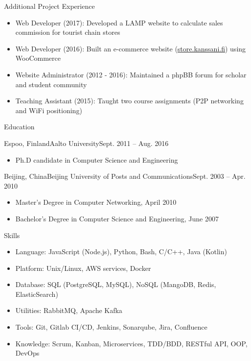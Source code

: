 \documentclass[print]{mcdowellcv}
\begin{document}
	\begin{cvsection}{Additional Project Experience}
		\begin{cvsubsection}{}{}{}	
			\begin{itemize}
				\item Web Developer (2017): Developed a LAMP website to calculate sales commission for tourist chain stores
				\item Web Developer (2016): Built an e-commerce website (\url{store.kanssani.fi}) using WooCommerce
				\item Website Administrator (2012 - 2016): Maintained a phpBB forum for scholar and student community
				\item Teaching Assistant (2015): Taught two course assignments (P2P networking and WiFi positioning)
			\end{itemize}
		\end{cvsubsection}
	\end{cvsection}
	
	\begin{cvsection}{Education}
		\begin{cvsubsection}{Espoo, Finland}{Aalto University}{Sept. 2011 -- Aug. 2016}
			\begin{itemize}
				\item Ph.D candidate in Computer Science and Engineering
			\end{itemize}
		\end{cvsubsection}

		\begin{cvsubsection}[3]{Beijing, China}{Beijing University of Posts and Communications}{Sept. 2003 --  Apr. 2010}
			\begin{itemize}
				\item Master's Degree in Computer Networking, April 2010
				\item Bachelor's Degree in Computer Science and Engineering, June 2007
			\end{itemize}
		\end{cvsubsection}
	\end{cvsection}

	\begin{cvsection}{Skills}
		\begin{cvsubsection}{}{}{}	
			\begin{itemize}
				\item Language: JavaScript (Node.js), Python, Bash, C/C++, Java (Kotlin)
				\item Platform: Unix/Linux, AWS services, Docker
                    \item Database: SQL (PostgreSQL, MySQL), NoSQL (MangoDB, Redis, ElasticSearch)
				\item Utilities: RabbitMQ, Apache Kafka
				\item Tools: Git, Gitlab CI/CD, Jenkins, Sonarqube, Jira, Confluence
				\item Knowledge: Scrum, Kanban, Microservices, TDD/BDD, RESTful API, OOP, DevOps
			\end{itemize}
		\end{cvsubsection}
	\end{cvsection}
\end{document}
